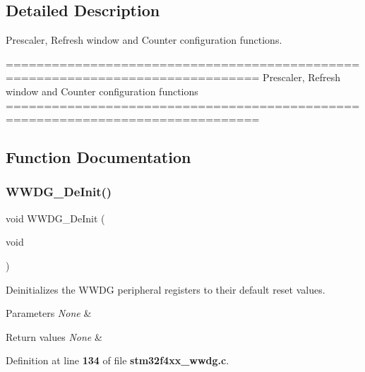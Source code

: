 \subsection{Detailed Description}
Prescaler, Refresh window and Counter configuration functions. 

\begin{DoxyVerb} ===============================================================================
          Prescaler, Refresh window and Counter configuration functions
 ===============================================================================  \end{DoxyVerb}
 

\subsection{Function Documentation}
\mbox{\label{group__WWDG__Group1_ga7130f4dc861b9234b62e73f9f57f89a1}} 
\subsubsection{W\+W\+D\+G\+\_\+\+De\+Init()}
{\footnotesize\ttfamily void W\+W\+D\+G\+\_\+\+De\+Init (\begin{DoxyParamCaption}\item[{void}]{ }\end{DoxyParamCaption})}



Deinitializes the W\+W\+DG peripheral registers to their default reset values. 


\begin{DoxyParams}{Parameters}
{\em None} & \\
\hline
\end{DoxyParams}

\begin{DoxyRetVals}{Return values}
{\em None} & \\
\hline
\end{DoxyRetVals}


Definition at line \textbf{ 134} of file \textbf{ stm32f4xx\+\_\+wwdg.\+c}.



